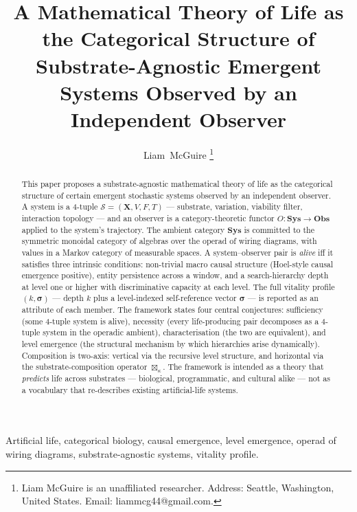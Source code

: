 \documentclass[journal]{IEEEtran}
\title{A Mathematical Theory of Life as the Categorical Structure of Substrate-Agnostic Emergent Systems Observed by an Independent Observer}
\author{Liam~McGuire%
\thanks{Liam McGuire is an unaffiliated researcher. Address:
Seattle, Washington, United States. Email: liammcg44@gmail.com.}}
\theoremstyle{plain}
\theoremstyle{definition}
\theoremstyle{plain}
\begin{document}
\maketitle
\sloppy
{}
\raggedbottom

\begin{abstract}
This paper proposes a substrate-agnostic mathematical theory of life as the
categorical structure of certain emergent stochastic systems observed by an
independent observer. A system is a 4-tuple
$\mathcal{S} = (\mathbf{X}, V, F, T)$ --- substrate, variation, viability
filter, interaction topology --- and an observer is a category-theoretic
functor $O : \mathbf{Sys} \to \mathbf{Obs}$ applied to the system's
trajectory. The ambient category $\mathbf{Sys}$ is committed to the symmetric
monoidal category of algebras over the operad of wiring diagrams, with values
in a Markov category of measurable spaces. A system--observer pair is
\emph{alive} iff it satisfies three intrinsic conditions: non-trivial macro
causal structure (Hoel-style causal emergence positive), entity persistence
across a window, and a search-hierarchy depth at level one or higher with
discriminative capacity at each level. The full vitality profile
$(k, \boldsymbol{\sigma})$ --- depth $k$ plus a level-indexed self-reference
vector $\boldsymbol{\sigma}$ --- is reported as an attribute of each member.
The framework states four central conjectures: sufficiency (some 4-tuple
system is alive), necessity (every life-producing pair decomposes as a
4-tuple system in the operadic ambient), characterisation (the two are
equivalent), and level emergence (the structural mechanism by which
hierarchies arise dynamically). Composition is two-axis: vertical via the
recursive level structure, and horizontal via the substrate-composition
operator $\boxtimes_\kappa$. The framework is intended as a theory that
\emph{predicts} life across substrates --- biological, programmatic, and
cultural alike --- not as a vocabulary that re-describes existing
artificial-life systems.
\end{abstract}

\begin{IEEEkeywords}
Artificial life, categorical biology, causal emergence, level emergence,
operad of wiring diagrams, substrate-agnostic systems, vitality profile.
\end{IEEEkeywords}
\end{document}
